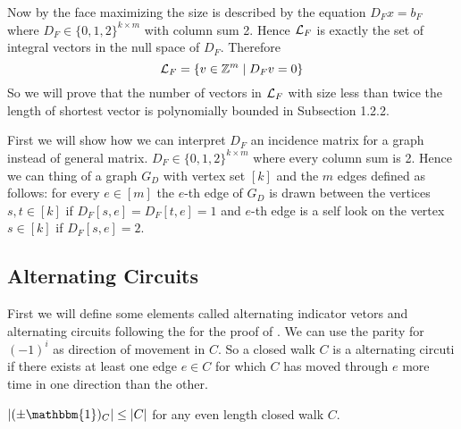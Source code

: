 Now by  the face maximizing the size is described by the equation $D_Fx=b_F$ where $D_F\in \{0,1,2\}^{k\times m}$ with column sum 2. Hence $\mathcal{L}_F$ is exactly the set of integral vectors in the null space of $D_F$. Therefore $$\mathcal{L}_F=\{v\in\mathbb{Z}^{m}\mid D_Fv=0\}$$So we will prove that the number of vectors in $\mathcal{L}_F$ with size less than twice the length of shortest vector is polynomially bounded in Subsection 1.2.2.

First we will show how we can interpret $D_F$ an incidence matrix for a graph instead of general matrix. $D_F\in \{0,1,2\}^{k\times m}$ where every column sum is 2. Hence we can thing of a graph $G_D$ with vertex set $[k]$ and the $m$ edges defined as follows: for every $e\in [m]$ the $e$-th edge of $G_D$ is drawn between the vertices $s,t\in[k]$ if $D_F[s,e]=D_F[t,e]=1$ and $e$-th edge is a self look on the vertex $s\in[k]$ if $D_F[s,e]=2$.  
\subsection{Alternating Circuits}
First we will define some elements called alternating indicator vetors and alternating circuits following the \cite{SvenssonTarnawski_2017_TMP_CONF} for the proof of .
We can use the parity for $(-1)^{i}$ as direction of movement in $C$. So a closed walk $C$ is a alternating circuti if there exists at least one edge $e\in C$ for which $C$ has moved through $e$ more time in one direction than the other.
\begin{observation*}
	$|(\pm \mathbbm{1})_C|\leq |C|$ for any even length closed walk $C$.
\end{observation*}


